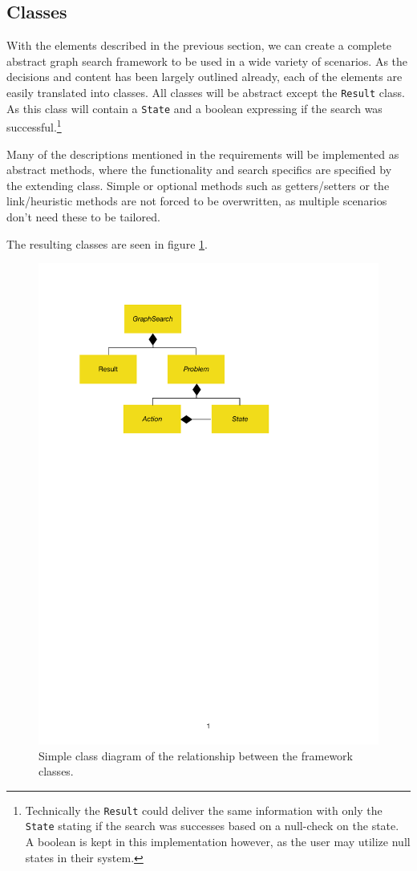 \subsection{Classes}

With the elements described in the previous section, we can create a complete abstract graph search framework to be used in a wide variety of scenarios. As the decisions and content has been largely outlined already, each of the elements are easily translated into classes. All classes will be abstract except the \texttt{Result} class. As this class will contain a \texttt{State} and a boolean expressing if the search was successful.\footnote{Technically the \texttt{Result} could deliver the same information with only the \texttt{State} stating if the search was successes based on a null-check on the state. A boolean is kept in this implementation however, as the user may utilize null states in their system.} 

Many of the descriptions mentioned in the requirements will be implemented as abstract methods, where the functionality and search specifics are specified by the extending class. Simple or optional methods such as getters/setters or the link/heuristic methods are not forced to be overwritten, as multiple scenarios don't need these to be tailored.

The resulting classes are seen in figure \ref{fig:framwork_classdiagram}.

\begin{figure}[H]
    \centering
    \includegraphics[width=0.6\linewidth]{FrameWork/AbstractFrameworkClassDiagram.pdf}
    \caption{Simple class diagram of the relationship between the framework classes.\protect\footnotemark}
    \label{fig:framwork_classdiagram}
\end{figure}

